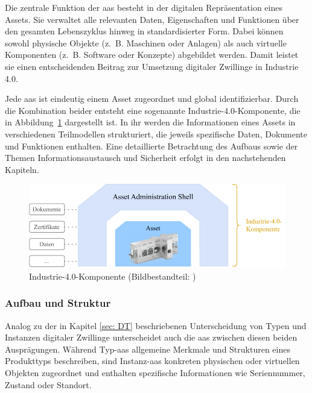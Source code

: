 Die zentrale Funktion der \acs{aas} besteht in der digitalen Repräsentation eines Assets. 
Sie verwaltet alle relevanten Daten, Eigenschaften und Funktionen über den gesamten Lebenszyklus hinweg in standardisierter Form. 
Dabei können sowohl physische Objekte (z.~B. Maschinen oder Anlagen) als auch virtuelle Komponenten (z.~B. Software oder Konzepte) abgebildet werden. 
Damit leistet sie einen entscheidenden Beitrag zur Umsetzung digitaler Zwillinge in Industrie 4.0.

Jede \acs{aas} ist eindeutig einem Asset zugeordnet und global identifizierbar. 
Durch die Kombination beider entsteht eine sogenannte Industrie-4.0-Komponente, die in Abbildung~\ref{fig:Industrie4Komponente} dargestellt ist. 
In ihr werden die Informationen eines Assets in verschiedenen Teilmodellen strukturiert, die jeweils spezifische Daten, Dokumente und Funktionen enthalten.
Eine detaillierte Betrachtung des Aufbaus sowie der Themen Informationsaustausch und Sicherheit erfolgt in den nachstehenden Kapiteln.

\vspace{0.25em}
\begin{figure}[htbp]
    \centering
    \includegraphics[width=1\textwidth]{Bilder/I4Komponente/I4KomponenteNeu.pdf}
    \caption[Industrie-4.0-Komponente]{Industrie-4.0-Komponente (Bildbestandteil: \cite{robocellLogo})}
    \label{fig:Industrie4Komponente}
\end{figure}

\subsubsection{Aufbau und Struktur}
Analog zu der in Kapitel \ref{sec: DT} beschriebenen Unterscheidung von Typen und Instanzen digitaler Zwillinge unterscheidet auch die \acs{aas} zwischen diesen beiden Ausprägungen.
Während Typ-\acs{aas} allgemeine Merkmale und Strukturen eines Produkttyps beschreiben, sind Instanz-\acs{aas} konkreten physischen oder virtuellen Objekten zugeordnet und enthalten spezifische Informationen wie Seriennummer, Zustand oder Standort.

